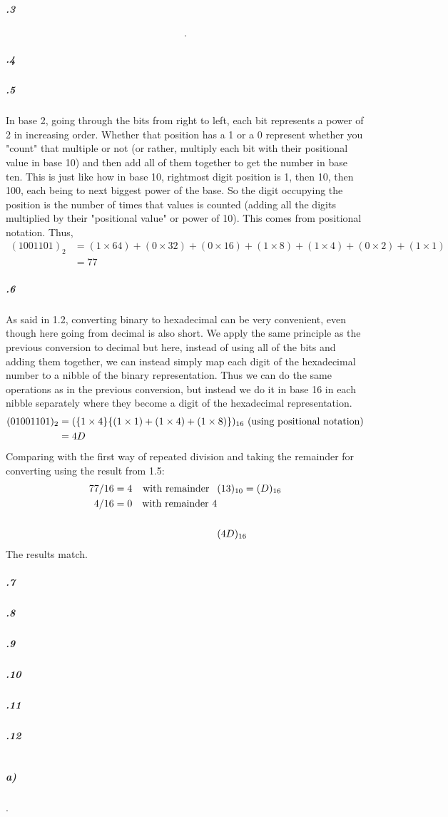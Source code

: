 \documentclass[11pt,letterpaper]{article}
\begin{document}
		\subparagraph{.3}
		\begin{align*}
		.
		\end{align*}
		
		
		\subparagraph{.4}
		
		\subparagraph{.5}
		In base 2, going through the bits from right to left, each bit represents a power of 2 in increasing order. Whether that position has a 1 or a 0 represent whether you "count" that multiple or not (or rather, multiply each bit with their positional value in base 10) and then add all of them together to get the number in base ten. This is just like how in base 10, rightmost digit position is 1, then 10, then 100, each being to next biggest power of the base. So the digit occupying the position is the number of times that values is counted (adding all the digits multiplied by their "positional value" or power of 10). This comes from positional notation.
		Thus,
		\begin{align*}
		(100 1101)_2 &= (1 \times 64) + (0 \times 32) + (0 \times 16) + (1 \times 8) + (1 \times 4) + (0 \times 2) + (1 \times 1)\\
		&= 77
		\end{align*}
		
		\subparagraph{.6}
		As said in 1.2, converting binary to hexadecimal can be very convenient, even though here going from decimal is also short. We apply the same principle as the previous conversion to decimal but here, instead of using all of the bits and adding them together, we can instead simply map each digit of the hexadecimal number to a nibble of the binary representation. Thus we can do the same operations as in the previous conversion, but instead we do it in base 16 in each nibble separately where they become a digit of the hexadecimal representation.
		\begin{align*}
		(0100 1101)_2 &= (\{1 \times 4\}\{(1 \times 1) + (1 \times 4) + (1 \times 8)\})_{16}\textnormal{ (using positional notation)}\\
		&= 4D
		\end{align*}
		Comparing with the first way of repeated division and taking the remainder for converting using the result from 1.5:
		\begin{align*}
		77 / 16 &= 4&\textnormal{with remainder\;\;\:}&(13)_{10} = (D)_{16}\\
		 4 / 16 &= 0&\textnormal{with remainder 4}&\\
		\\
		&&&(4D)_{16}
		\end{align*}
		The results match.
		
		\subparagraph{.7}
		
		\subparagraph{.8}
		
		\subparagraph{.9}
		
		\subparagraph{.10}
		
		\subparagraph{.11}
		
		\subparagraph{.12}
		
		
	\section{}
	
		\subparagraph{a)}
		.
		
\end{document}
